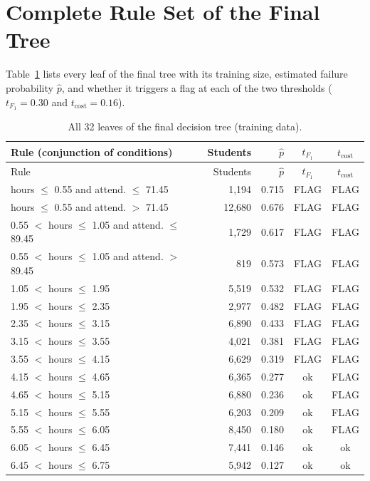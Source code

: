 \documentclass[12pt,a4paper]{article}
\theoremstyle{definition}
\begin{document}
\newpage
\appendix
\section{Complete Rule Set of the Final Tree}\label{app:rules}

Table~\ref{tab:rules} lists every leaf of the final tree with its training size, estimated failure probability $\hat p$, and whether it triggers a flag at each of the two thresholds ($t_{F_1}=0.30$ and $t_{\mathrm{cost}}=0.16$).

\begingroup\small
\begin{longtable}{p{7.3cm}rrcc}
\caption{All 32 leaves of the final decision tree (training data).}\label{tab:rules}\\
\toprule
Rule (conjunction of conditions) & Students & $\hat p$ & $t_{F_1}$ & $t_{\mathrm{cost}}$ \\
\midrule
\endfirsthead
\toprule
Rule & Students & $\hat p$ & $t_{F_1}$ & $t_{\mathrm{cost}}$ \\
\midrule
\endhead
hours $\leq$ 0.55 and attend. $\leq$ 71.45 & 1{,}194 & 0.715 & FLAG & FLAG \\
hours $\leq$ 0.55 and attend. $>$ 71.45 & 12{,}680 & 0.676 & FLAG & FLAG \\
0.55 $<$ hours $\leq$ 1.05 and attend. $\leq$ 89.45 & 1{,}729 & 0.617 & FLAG & FLAG \\
0.55 $<$ hours $\leq$ 1.05 and attend. $>$ 89.45 & 819 & 0.573 & FLAG & FLAG \\
1.05 $<$ hours $\leq$ 1.95 & 5{,}519 & 0.532 & FLAG & FLAG \\
1.95 $<$ hours $\leq$ 2.35 & 2{,}977 & 0.482 & FLAG & FLAG \\
2.35 $<$ hours $\leq$ 3.15 & 6{,}890 & 0.433 & FLAG & FLAG \\
3.15 $<$ hours $\leq$ 3.55 & 4{,}021 & 0.381 & FLAG & FLAG \\
3.55 $<$ hours $\leq$ 4.15 & 6{,}629 & 0.319 & FLAG & FLAG \\
4.15 $<$ hours $\leq$ 4.65 & 6{,}365 & 0.277 & ok & FLAG \\
4.65 $<$ hours $\leq$ 5.15 & 6{,}880 & 0.236 & ok & FLAG \\
5.15 $<$ hours $\leq$ 5.55 & 6{,}203 & 0.209 & ok & FLAG \\
5.55 $<$ hours $\leq$ 6.05 & 8{,}450 & 0.180 & ok & FLAG \\
6.05 $<$ hours $\leq$ 6.45 & 7{,}441 & 0.146 & ok & ok \\
6.45 $<$ hours $\leq$ 6.75 & 5{,}942 & 0.127 & ok & ok \\

\end{longtable}
\end{document}
